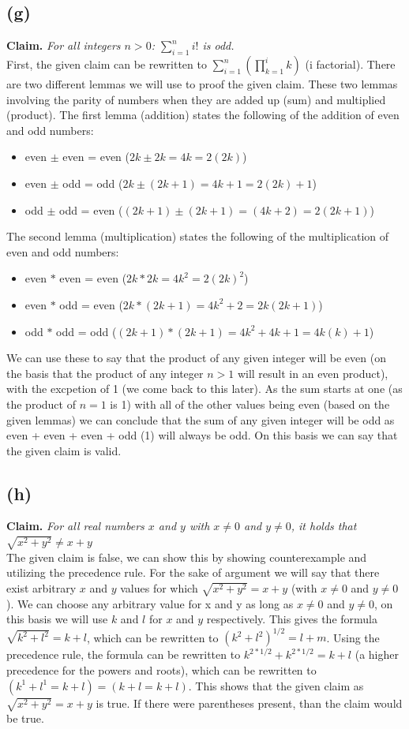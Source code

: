 \documentclass[a4paper]{article}
\begin{document}
\subsection{(g)}
\textbf{Claim.} \textit{For all integers $n > 0$: $\sum_{i=1}^{n} i!$ is odd.}\\
First, the given claim can be rewritten to $\sum_{i=1}^{n} (\prod_{k=1}^{i}k)$ (i factorial).
There are two different lemmas we will use to proof the given claim.
These two lemmas involving the parity of numbers when they are added up (sum) and multiplied (product).
The first lemma (addition) states the following of the addition of even and odd numbers:
\begin{itemize}
    \item even $\pm$ even = even ($2k \pm 2k = 4k = 2(2k)$)
    \item even $\pm$ odd = odd ($2k \pm (2k+1) = 4k + 1 = 2(2k) + 1$)
    \item odd $\pm$ odd = even ($(2k + 1) \pm (2k + 1) = (4k + 2) = 2(2k+1)$)
\end{itemize}
The second lemma (multiplication) states the following of the multiplication of even and odd numbers:
\begin{itemize}
    \item even $\ast$ even = even ($2k \ast 2k = 4k^2 = 2(2k)^2$)
    \item even $\ast$ odd = even ($2k \ast (2k + 1 ) = 4k^2 + 2 = 2k(2k+1) $)
    \item odd $\ast$ odd = odd ($(2k+1) \ast (2k+1) = 4k^2 + 4k + 1 = 4k(k) + 1$)
\end{itemize}
We can use these to say that the product of any given integer will be even (on the basis that the product of any integer $n > 1$ will result in an even product), with the excpetion of 1 (we come back to this later).
As the sum starts at one (as the product of $n = 1$ is 1) with all of the other values being even (based on the given lemmas) we can conclude that the sum of any given integer will be odd as even + even + even + odd (1) will always be odd.
On this basis we can say that the given claim is valid.
\subsection{(h)}
\textbf{Claim.} \textit{For all real numbers $x$ and $y$ with $x \neq 0$ and $y \neq 0$, it holds that $\sqrt{x^2 + y^2} \neq x + y$} \\
The given claim is false, we can show this by showing counterexample and utilizing the precedence rule.
For the sake of argument we will say that there exist arbitrary $x$ and $y$ values for which $\sqrt{x^2 + y^2} = x + y$ (with $x \neq 0$ and $y \neq 0$).
We can choose any arbitrary value for x and y as long as $x \neq 0$ and $y \neq 0$, on this basis we will use $k$ and $l$ for $x$ and $y$ respectively.
This gives the formula $\sqrt{k^2 + l^2} = k + l$, which can be rewritten to $(k^2 + l^2)^{1/2} = l + m$.
Using the precedence rule, the formula can be rewritten to $k^{2 * 1/2} + k^{2 * 1/2} = k +l$ (a higher precedence for the powers and roots), which can be rewritten to $(k^1 + l^1 = k + l) = (k + l = k + l)$.
This shows that the given claim as $\sqrt{x^2 + y^2} = x + y$ is true.
If there were parentheses present, than the claim would be true.
\end{document}
